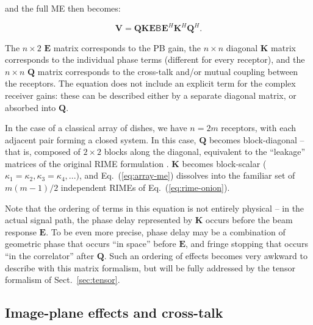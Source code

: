 \documentclass{aa}
\newcommand{\herm}{H}
\newcommand{\coh}[2]{\mathsf{{#1}}_{{#2}}}
\begin{document}
and the full ME then becomes:

\begin{equation}
\mathbf{V} = \mathbf{QKE} \coh{B}{} \mathbf{E}^\herm \mathbf{K}^\herm \mathbf{Q}^\herm.
\label{eq:array-me}
\end{equation}


The $n\times2$ \textbf{$\mathbf{E}$} matrix corresponds to the PB gain,
the $n\times n$ diagonal $\mathbf{K}$ matrix corresponds to the individual
phase terms (different for every receptor), and the $n\times n$ $\mathbf{Q}$
matrix corresponds to the cross-talk and/or mutual coupling between the
receptors. The equation does not include an explicit term for the 
complex receiver gains: these can be described either by a separate diagonal matrix,
or absorbed into $\mathbf{Q}$.

In the case of a classical array of dishes, we have $n=2m$ receptors, with each
adjacent pair forming a closed system. In this case, $\mathbf{Q}$ becomes block-diagonal -- that is, composed of $2\times2$ blocks along the diagonal, equivalent to the ``leakage'' matrices of the original RIME formulation \citep{ME1}. $\mathbf{K}$ becomes block-scalar ($\kappa_{1}=\kappa_{2},\kappa_{3}=\kappa_{4},...)$, and Eq.~(\ref{eq:array-me}) 
dissolves into the familiar set of $m(m-1)/2$ independent RIMEs of Eq.~(\ref{eq:rime-onion}).

Note that the ordering of terms in this equation is not entirely physical
-- in the actual signal path, the phase delay represented by $\mathbf{K}$
occurs before the beam response $\mathbf{E}$. To be even more precise, phase 
delay may be a combination of geometric phase that occurs ``in space'' before $\mathbf{E}$, and fringe stopping 
that occurs ``in the correlator'' after $\mathbf{Q}$. Such an ordering of effects 
becomes very awkward to describe with this matrix formalism,  
but will be fully addressed by the tensor formalism of Sect.~\ref{sec:tensor}.

\subsection{Image-plane effects and cross-talk}
\label{sec:matrix-image-plane}
\end{document}
